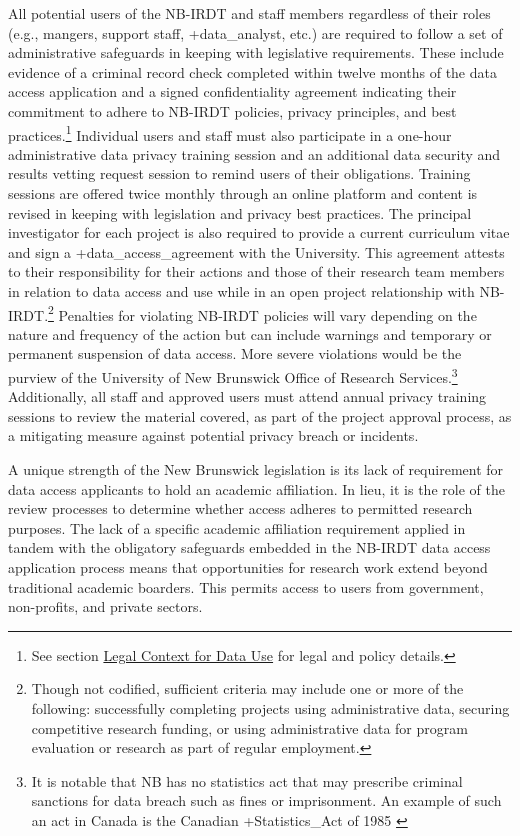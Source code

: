 \documentclass[
]{book}
\begin{document}
All potential users of the NB-IRDT and staff members regardless of their roles (e.g., mangers, support staff, +data\_analyst\textbar, etc.) are required to follow a set of administrative safeguards in keeping with legislative requirements. These include evidence of a criminal record check completed within twelve months of the data access application and a signed confidentiality agreement indicating their commitment to adhere to NB-IRDT policies, privacy principles, and best practices.\footnote{See section \protect\hyperlink{legal-context-for-data-use-8}{Legal Context for Data Use} for legal and policy details.} Individual users and staff must also participate in a one-hour administrative data privacy training session and an additional data security and results vetting request session to remind users of their obligations. Training sessions are offered twice monthly through an online platform and content is revised in keeping with legislation and privacy best practices. The principal investigator for each project is also required to provide a current curriculum vitae and sign a +data\_access\_agreement\textbar{} with the University. This agreement attests to their responsibility for their actions and those of their research team members in relation to data access and use while in an open project relationship with NB-IRDT.\footnote{Though not codified, sufficient criteria may include one or more of the following: successfully completing projects using administrative data, securing competitive research funding, or using administrative data for program evaluation or research as part of regular employment.} Penalties for violating NB-IRDT policies will vary depending on the nature and frequency of the action but can include warnings and temporary or permanent suspension of data access. More severe violations would be the purview of the University of New Brunswick Office of Research Services.\footnote{It is notable that NB has no statistics act that may prescribe criminal sanctions for data breach such as fines or imprisonment. An example of such an act in Canada is the Canadian +Statistics\_Act\textbar{} of 1985 \citep{governmentofcanada1985}} Additionally, all staff and approved users must attend annual privacy training sessions to review the material covered, as part of the project approval process, as a mitigating measure against potential privacy breach or incidents.

A unique strength of the New Brunswick legislation is its lack of requirement for data access applicants to hold an academic affiliation. In lieu, it is the role of the review processes to determine whether access adheres to permitted research purposes. The lack of a specific academic affiliation requirement applied in tandem with the obligatory safeguards embedded in the NB-IRDT data access application process means that opportunities for research work extend beyond traditional academic boarders. This permits access to users from government, non-profits, and private sectors.
\end{document}
